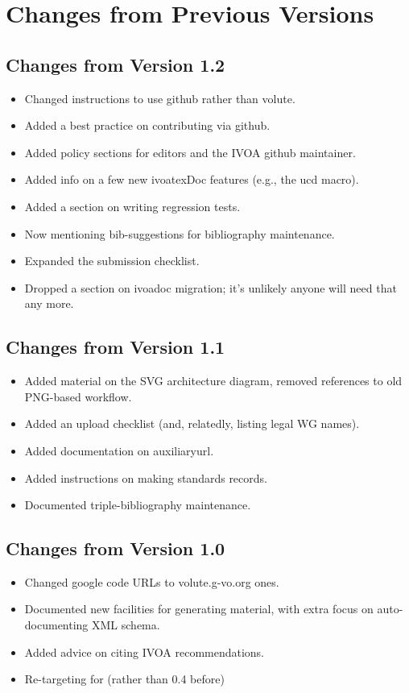\documentclass[11pt,a4paper]{ivoa}
\begin{document}
\appendix
\section{Changes from Previous Versions}

\subsection{Changes from Version 1.2}

\begin{itemize}
\item Changed instructions to use github rather than volute.
\item Added a best practice on contributing via github.
\item Added policy sections for editors and the IVOA github maintainer.
\item Added info on a few new ivoatexDoc features (e.g., the ucd macro).
\item Added a section on writing regression tests.
\item Now mentioning bib-suggestions for bibliography maintenance.
\item Expanded the submission checklist.
\item Dropped a section on ivoadoc migration; it's unlikely anyone
will need that any more.
\end{itemize}

\subsection{Changes from Version 1.1}

\begin{itemize}
\item Added material on the SVG architecture diagram, removed references
to old PNG-based workflow.
\item Added an upload checklist (and, relatedly, listing legal WG names).
\item Added documentation on auxiliaryurl.
\item Added instructions on making standards records.
\item Documented triple-bibliography maintenance.
\end{itemize}

\subsection{Changes from Version 1.0}
\begin{itemize}
\item Changed google code URLs to volute.g-vo.org ones.
\item Documented new facilities for generating material, with extra
focus on auto-documenting XML schema.
\item Added advice on citing IVOA recommendations.
\item Re-targeting for  (rather than 0.4 before)
\end{itemize}



\end{document}

